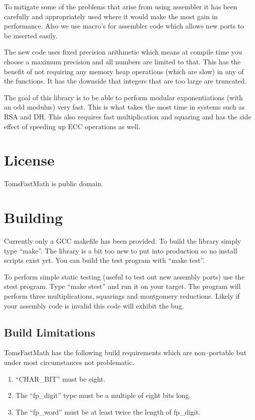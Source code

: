 \documentclass[b5paper]{book}
\begin{document}
To mitigate some of the problems that arise from using assembler it has been carefully and 
appropriately used where it would make the most gain in performance.  Also we use macro's
for assembler code which allows new ports to be inserted easily.

The new code uses fixed precision arithmetic which means at compile time you choose a maximum 
precision and all numbers are limited to that.  This has the benefit of not requiring any
memory heap operations (which are slow) in any of the functions.  It has the downside that 
integers that are too large are truncated.

The goal of this library is to be able to perform modular exponentiations (with an odd modulus) very
fast.  This is what takes the most time in systems such as RSA and DH.  This also requires
fast multiplication and squaring and has the side effect of speeding up ECC operations as well.

\section{License}
TomsFastMath is public domain.

\section{Building}
Currently only a GCC makefile has been provided.  To build the library simply type
``make''.  The library is a bit too new to put into production so no install
scripts exist yet.  You can build the test program with ``make test''.

To perform simple static testing (useful to test out new assembly ports) use the stest
program.  Type ``make stest'' and run it on your target.  The program will perform three
multiplications, squarings and montgomery reductions.  Likely if your assembly 
code is invalid this code will exhibit the bug.

\subsection{Build Limitations}
TomsFastMath has the following build requirements which are non--portable but under most 
circumstances not problematic.

\begin{enumerate}
\item ``CHAR\_BIT'' must be eight.  
\item The ``fp\_digit'' type must be a multiple of eight bits long.
\item The ``fp\_word'' must be at least twice the length of fp\_digit.
\end{enumerate}
\end{document}
